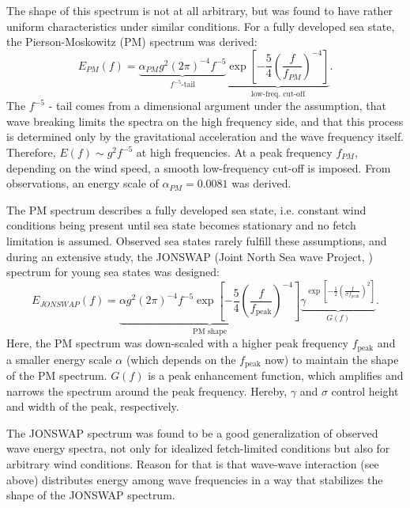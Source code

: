 The shape of this spectrum is not at all arbitrary, but was found to have 
rather uniform characteristics under similar conditions. For a fully 
developed sea state, the Pierson-Moskowitz (PM) spectrum was derived: 
\begin{equation}
 \label{PMspectrum}
 E_{PM}(f) = \underbrace{\alpha_{PM}g^2(2 
\pi)^{-4}f^{-5}}_{f^{-5}\text{-tail}} \underbrace{\exp \left[ - \frac{5}{4} 
\left( \frac{f}{f_{PM}} \right)^{-4} \right]}_{\text{low-freq. cut-off}}.
\end{equation}
The $f^{-5}$ - tail comes from a dimensional argument under the assumption, 
that wave breaking limits the spectra on the high frequency side, and that this 
process is determined only by the gravitational acceleration and the wave 
frequency itself. Therefore, $E(f) \sim g^2f^{-5}$ at high frequencies. At a 
peak frequency $f_{PM}$, depending on the wind speed, a smooth low-frequency 
cut-off is imposed. From observations, an energy scale of $\alpha_{PM} = 
0.0081$ was derived.

The PM spectrum describes a fully developed sea state, i.e. 
constant wind conditions being present until sea state becomes stationary and 
no fetch limitation is assumed. Observed sea states rarely fulfill these 
assumptions, and during an extensive study, the JONSWAP (Joint North Sea wave 
Project, \cite{hasselmann1974}) spectrum for young sea states was designed:
\begin{equation}
 \label{JONSWAPspectrum}
 E_{JONSWAP}(f) = \underbrace{\alpha g^2(2 
\pi)^{-4}f^{-5} \exp \left[ - \frac{5}{4} \left( \frac{f}{f_{\text{peak}}} 
\right)^{-4} \right]}_{\text{PM shape}} \underbrace{\gamma^{\exp \left[ - 
\frac{1}{2} \left( \frac{f}{\sigma f_{\text{peak}}} \right)^2 \right]}}_{G(f)}.
\end{equation}
Here, the PM spectrum was down-scaled with a higher peak frequency 
$f_\text{peak}$ and a smaller energy scale $\alpha$ (which depends on the 
$f_\text{peak}$ now) to maintain the shape of the PM spectrum. $G(f)$ is a peak 
enhancement function, which amplifies and narrows the spectrum around the peak 
frequency. Hereby, $\gamma$ and $\sigma$ control height and width of the peak, 
respectively. 

The JONSWAP spectrum was found to be a good generalization of observed wave 
energy spectra, not only for idealized fetch-limited conditions but also for 
arbitrary wind conditions. Reason for that is that wave-wave interaction (see 
above) distributes energy among wave frequencies in a way that stabilizes the 
shape of the JONSWAP spectrum. 

